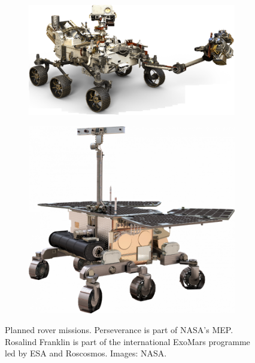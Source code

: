 \begin{figure}[h]
\captionsetup[subfigure]{justification=centering}
\vspace{-2ex}
	\centering
    \setlength{\graphicsHeight}{50mm}
    \hypersetup{hidelinks=true}%
	\begin{subfigure}[t]{0.65\textwidth}
        \centering
		\includegraphics[height=\graphicsHeight]{sections/state-of-the-art/planned-missions/images/rover-mars2020.png}
		\label{fig:sub:planned-mission-rover-mars2020}
	\end{subfigure}\hfill
	\begin{subfigure}[t]{0.35\textwidth}
        \centering
		\includegraphics[height=\graphicsHeight]{sections/state-of-the-art/planned-missions/images/rover-exomars.png}
		\label{fig:sub:planned-mission-rover-exomars}
	\end{subfigure}
	\caption[Planned rover missions]
            {Planned rover missions. Perseverance is part of \ac{NASA}'s \ac{MEP}. Rosalind Franklin is part of the international ExoMars programme led by \ac{ESA} and Roscosmos. Images: NASA.}
	\label{fig:planned-mission-rovers}
\vspace{-2ex}
\end{figure}

